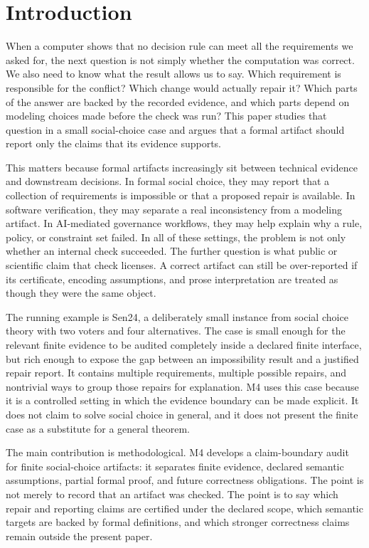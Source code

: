 \section{Introduction}

When a computer shows that no decision rule can meet all the requirements we
asked for, the next question is not simply whether the computation was
correct. We also need to know what the result allows us to say. Which
requirement is responsible for the conflict? Which change would actually
repair it? Which parts of the answer are backed by the recorded evidence, and
which parts depend on modeling choices made before the check was run? This
paper studies that question in a small social-choice case and argues that a
formal artifact should report only the claims that its evidence supports.

This matters because formal artifacts increasingly sit between technical
evidence and downstream decisions. In formal social choice, they may report
that a collection of requirements is impossible or that a proposed repair is
available. In software verification, they may separate a real inconsistency
from a modeling artifact. In AI-mediated governance workflows, they may help
explain why a rule, policy, or constraint set failed. In all of these settings,
the problem is not only whether an internal check succeeded. The further
question is what public or scientific claim that check licenses. A correct
artifact can still be over-reported if its certificate, encoding assumptions,
and prose interpretation are treated as though they were the same object.

The running example is Sen24, a deliberately small instance from social choice
theory with two voters and four alternatives. The case is small enough for the
relevant finite evidence to be audited completely inside a declared finite
interface, but rich enough to expose the gap between an impossibility result
and a justified repair report. It contains multiple requirements, multiple
possible repairs, and nontrivial ways to group those repairs for explanation.
M4 uses this case because it is a controlled setting in which the evidence
boundary can be made explicit. It
does not claim to solve social choice in general, and it does not present the
finite case as a substitute for a general theorem.

The main contribution is methodological. M4 develops a claim-boundary audit for
finite social-choice artifacts: it separates finite evidence, declared semantic
assumptions, partial formal proof, and future correctness obligations. The
point is not merely to record that an artifact was checked. The point is to say
which repair and reporting claims are certified under the declared scope,
which semantic targets are backed by formal definitions, and which stronger
correctness claims remain outside the present paper.

